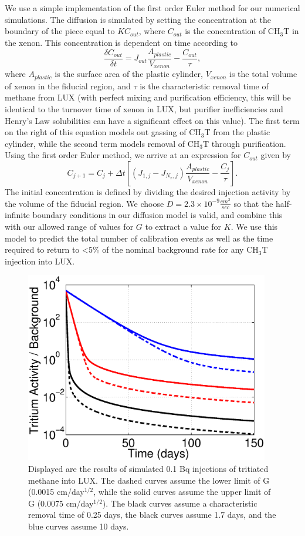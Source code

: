 We use a simple implementation of the first order Euler method for our numerical simulations. The diffusion is simulated by setting the concentration at the boundary of the piece equal to $KC_{out}$, where $C_{out}$ is the concentration of CH$_3$T in the xenon.  This concentration is dependent on time according to
\[\frac{\delta C_{out}}{\delta t} = J_{out} \frac{A_{plastic}}{V_{xenon}}-\frac{C_{out}}{\tau},\]
where $A_{plastic}$ is the surface area of the plastic cylinder, $V_{xenon}$ is the total volume of xenon in the fiducial region, and $\tau$ is the characteristic removal time of methane from LUX (with perfect mixing and purification efficiency, this will be identical to the turnover time of xenon in LUX, but purifier inefficiencies and Henry's Law solubilities can have a significant effect on this value).  The first term on the right of this equation models out gassing of CH$_3$T from the plastic cylinder, while the second term models removal of CH$_3$T through purification.  Using the first order Euler method, we arrive at an expression for $C_{out}$ given by
\[C_{j+1}=C_j + \Delta t \left[(J_{1,j}-J_{N_x,j})\frac{A_{plastic}}{V_{xenon}}-\frac{C_j}{\tau}\right].\]
The initial concentration is defined by dividing the desired injection activity by the volume of the fiducial region.  We choose $D = 2.3 \times 10^{-9} \frac {cm^2}{sec}$ so that the half-infinite boundary conditions in our diffusion model is valid, and combine this with our allowed range of values for $G$ to extract a value for $K$.  We use this model to predict the total number of calibration events as well as the time required to return to \textless 5\% of the nominal background rate for any CH$_3$T injection into LUX.  

\begin{figure}[h!]
\centering
\includegraphics[width=0.95\textwidth]{tau_G_var_CH3T.eps}
\caption{Displayed are the results of simulated 0.1 Bq injections of tritiated methane into LUX. The dashed curves assume the lower limit of G (0.0015 cm/day$^{1/2}$, while the solid curves assume the upper limit of G (0.0075 cm/day$^{1/2}$). The black curves assume a  characteristic removal time of 0.25 days, the black curves assume 1.7 days, and the blue curves assume 10 days.}
\label{fig:tau_var}
\end{figure}


